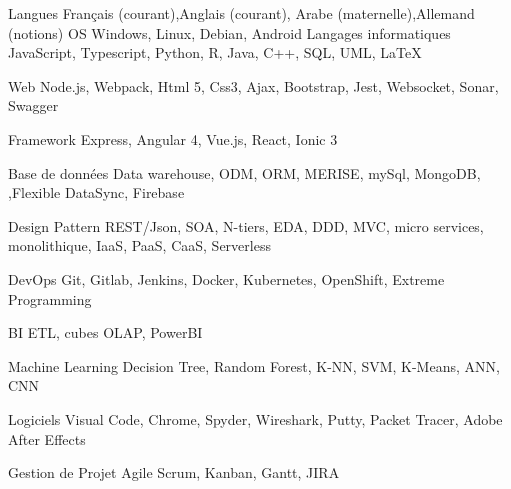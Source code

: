 

\begin{cvskills}
  \cvskill
    {Langues } %
    {Français  (courant),Anglais (courant), Arabe (maternelle),Allemand (notions)} %
  \cvskill
    {OS} %
    {Windows, Linux, Debian, Android} %
  \cvskill
    {Langages informatiques} %
    {JavaScript, Typescript, Python, R, Java, C++, SQL, UML, LaTeX} %

  \cvskill
    {Web} %
    {Node.js, Webpack, Html 5, Css3, Ajax, Bootstrap, Jest, Websocket, Sonar, Swagger} %

  \cvskill
    {Framework} %
    {Express, Angular 4, Vue.js, React, Ionic 3} %

  \cvskill
    {Base de données} %
    {Data warehouse, ODM, ORM, MERISE, mySql, MongoDB, ,Flexible DataSync, Firebase } %

  \cvskill
    {Design Pattern} %
    {REST/Json, SOA, N-tiers, EDA, DDD, MVC, micro services, monolithique, IaaS, PaaS, CaaS, Serverless } %

  \cvskill
    {DevOps} %
    {Git, Gitlab, Jenkins, Docker, Kubernetes, OpenShift, Extreme Programming  } %

\cvskill
    {BI} %
    {ETL, cubes OLAP, PowerBI } %


\cvskill
    {Machine Learning} %
    {Decision Tree, Random Forest, K-NN, SVM, K-Means, ANN, CNN } %

\cvskill
    {Logiciels} %
    {Visual Code, Chrome, Spyder, Wireshark, Putty, Packet Tracer, Adobe After Effects  } %


\cvskill
    {Gestion de Projet} %
    {Agile Scrum, Kanban, Gantt, JIRA } %

\end{cvskills}
